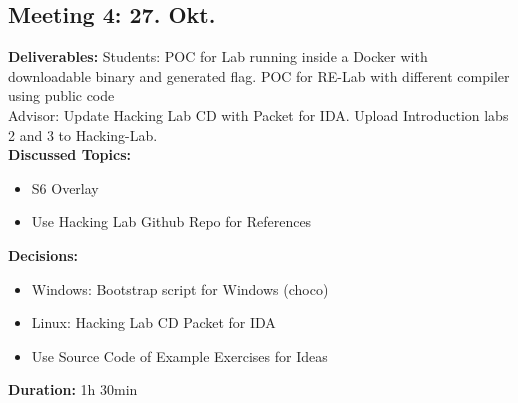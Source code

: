 \subsection*{Meeting 4: 27. Okt.}
\textbf{Deliverables:} Students: POC for Lab running inside a Docker with downloadable binary and generated flag. POC for RE-Lab with different compiler using public code \\ 
Advisor: Update Hacking Lab CD with Packet for IDA. Upload Introduction labs 2 and 3 to Hacking-Lab. \\
\textbf{Discussed Topics:} 
\begin{itemize}
    \item S6 Overlay
    \item Use Hacking Lab Github Repo for References
\end{itemize}
\textbf{Decisions:} 
\begin{itemize}
    \item Windows: Bootstrap script for Windows (choco)
    \item Linux: Hacking Lab CD Packet for IDA
    \item Use Source Code of Example Exercises for Ideas
\end{itemize}
\textbf{Duration:} 1h 30min

